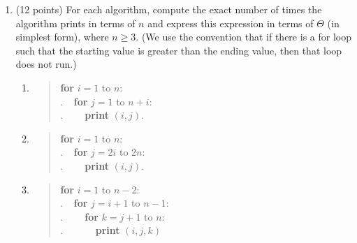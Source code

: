 \documentclass[10pt,letterpaper,unboxed,cm]{article}
\newcommand{\ind}{$~~~~~$}
\begin{document}
\begin{enumerate}
The $O(n^2)$ bound is not tight because not every
merge involves $n$ elements.

Since the algorithm merges lists in queue order,
the lists being merged have roughly equal sizes.

In the first round, merging lists of size 1
costs $O(2)$ per merge, with about $n/2$ merges:
\[\frac{n}{2}\cdot O(2)=O(n).\]

In the next round, merging lists of size 2
costs $O(4)$ per merge, with about $n/4$ merges:
\[\frac{n}{4}\cdot O(4)=O(n).\]

This continues, with each round taking $O(n)$ time.

Since the list sizes approximately double each
round, there are $O(\log n)$ rounds.

Therefore,
\[T(n)=O(n)\cdot O(\log n)=\boxed{O(n\log n)}.\]

Thus, $O(n^2)$ is not a tight upper bound.


\item (12 points)
For each algorithm, compute the exact number of times the algorithm prints in terms of $n$ and express this expression in terms of $\Theta$ (in simplest form), where $n \geq 3$. (We use the convention that if there is a for loop such that the starting value is greater than the ending value, then that loop does not run.)

\begin{enumerate}

\item
\begin{quote}
{\bf for} $i=1$ to $n$:\\
.\ind{\bf for} $j=1$ to $n+i$:\\
.\ind\ind {\bf print} $(i,j)$.
\end{quote}

\item
\begin{quote}
{\bf for} $i=1$ to $n$:\\
.\ind{\bf for} $j=2i$ to $2n$:\\
.\ind\ind {\bf print} $(i,j)$.
\end{quote}


\item
\begin{quote}
{\bf for} $i=1$ to $n-2$:\\
.\ind{\bf for} $j=i+1$ to $n-1$:\\
.\ind\ind{\bf for} $k=j+1$ to $n$:\\
.\ind\ind\ind {\bf print} $(i,j,k)$
\end{quote}



\end{enumerate}
\end{enumerate}
\end{document}
